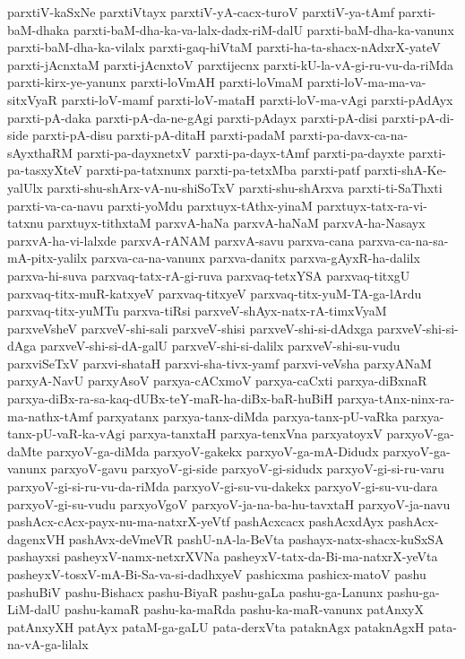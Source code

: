 {parxtiV-kaSxNe
parxtiVtayx
parxtiV-yA-cacx-turoV
parxtiV-ya-tAmf
parxti-baM-dhaka
parxti-baM-dha-ka-va-lalx-dadx-riM-dalU
parxti-baM-dha-ka-vanunx
parxti-baM-dha-ka-vilalx
parxti-gaq-hiVtaM
parxti-ha-ta-shacx-nAdxrX-yateV
parxti-jAcnxtaM
parxti-jAcnxtoV
parxtijecnx
parxti-kU-la-vA-gi-ru-vu-da-riMda
parxti-kirx-ye-yanunx
parxti-loVmAH
parxti-loVmaM
parxti-loV-ma-ma-va-sitxVyaR
parxti-loV-mamf
parxti-loV-mataH
parxti-loV-ma-vAgi
parxti-pAdAyx
parxti-pA-daka
parxti-pA-da-ne-gAgi
parxti-pAdayx
parxti-pA-disi
parxti-pA-di-side
parxti-pA-disu
parxti-pA-ditaH
parxti-padaM
parxti-pa-davx-ca-na-sAyxthaRM
parxti-pa-dayxnetxV
parxti-pa-dayx-tAmf
parxti-pa-dayxte
parxti-pa-tasxyXteV
parxti-pa-tatxnunx
parxti-pa-tetxMba
parxti-patf
parxti-shA-Ke-yalUlx
parxti-shu-shArx-vA-nu-shiSoTxV
parxti-shu-shArxva
parxti-ti-SaThxti
parxti-va-ca-navu
parxti-yoMdu
parxtuyx-tAthx-yinaM
parxtuyx-tatx-ra-vi-tatxnu
parxtuyx-tithxtaM
parxvA-haNa
parxvA-haNaM
parxvA-ha-Nasayx
parxvA-ha-vi-lalxde
parxvA-rANAM
parxvA-savu
parxva-cana
parxva-ca-na-sa-mA-pitx-yalilx
parxva-ca-na-vanunx
parxva-danitx
parxva-gAyxR-ha-dalilx
parxva-hi-suva
parxvaq-tatx-rA-gi-ruva
parxvaq-tetxYSA
parxvaq-titxgU
parxvaq-titx-muR-katxyeV
parxvaq-titxyeV
parxvaq-titx-yuM-TA-ga-lArdu
parxvaq-titx-yuMTu
parxva-tiRsi
parxveV-shAyx-natx-rA-timxVyaM
parxveVsheV
parxveV-shi-sali
parxveV-shisi
parxveV-shi-si-dAdxga
parxveV-shi-si-dAga
parxveV-shi-si-dA-galU
parxveV-shi-si-dalilx
parxveV-shi-su-vudu
parxviSeTxV
parxvi-shataH
parxvi-sha-tivx-yamf
parxvi-veVsha
parxyANaM
parxyA-NavU
parxyAsoV
parxya-cACxmoV
parxya-caCxti
parxya-diBxnaR
parxya-diBx-ra-sa-kaq-dUBx-teY-maR-ha-diBx-baR-huBiH
parxya-tAnx-ninx-ra-ma-nathx-tAmf
parxyatanx
parxya-tanx-diMda
parxya-tanx-pU-vaRka
parxya-tanx-pU-vaR-ka-vAgi
parxya-tanxtaH
parxya-tenxVna
parxyatoyxV
parxyoV-ga-daMte
parxyoV-ga-diMda
parxyoV-gakekx
parxyoV-ga-mA-Didudx
parxyoV-ga-vanunx
parxyoV-gavu
parxyoV-gi-side
parxyoV-gi-sidudx
parxyoV-gi-si-ru-varu
parxyoV-gi-si-ru-vu-da-riMda
parxyoV-gi-su-vu-dakekx
parxyoV-gi-su-vu-dara
parxyoV-gi-su-vudu
parxyoVgoV
parxyoV-ja-na-ba-hu-tavxtaH
parxyoV-ja-navu
pashAcx-cAcx-payx-nu-ma-natxrX-yeVtf
pashAcxcacx
pashAcxdAyx
pashAcx-dagenxVH
pashAvx-deVmeVR
pashU-nA-la-BeVta
pashayx-natx-shacx-kuSxSA
pashayxsi
pasheyxV-namx-netxrXVNa
pasheyxV-tatx-da-Bi-ma-natxrX-yeVta
pasheyxV-tosxV-mA-Bi-Sa-va-si-dadhxyeV
pashicxma
pashicx-matoV
pashu
pashuBiV
pashu-Bishacx
pashu-BiyaR
pashu-gaLa
pashu-ga-Lanunx
pashu-ga-LiM-dalU
pashu-kamaR
pashu-ka-maRda
pashu-ka-maR-vanunx
patAnxyX
patAnxyXH
patAyx
pataM-ga-gaLU
pata-derxVta
pataknAgx
pataknAgxH
pata-na-vA-ga-lilalx
}
